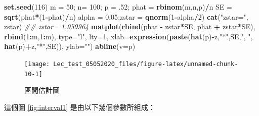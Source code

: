 \documentclass[hyperref,]{ctexart}
\newenvironment{Shaded}{\begin{snugshade}}{\end{snugshade}}
\newcommand{\CommentTok}[1]{\textcolor[rgb]{0.56,0.35,0.01}{\textit{#1}}}
\newcommand{\DataTypeTok}[1]{\textcolor[rgb]{0.13,0.29,0.53}{#1}}
\newcommand{\DecValTok}[1]{\textcolor[rgb]{0.00,0.00,0.81}{#1}}
\newcommand{\FloatTok}[1]{\textcolor[rgb]{0.00,0.00,0.81}{#1}}
\newcommand{\KeywordTok}[1]{\textcolor[rgb]{0.13,0.29,0.53}{\textbf{#1}}}
\newcommand{\NormalTok}[1]{#1}
\newcommand{\OperatorTok}[1]{\textcolor[rgb]{0.81,0.36,0.00}{\textbf{#1}}}
\newcommand{\StringTok}[1]{\textcolor[rgb]{0.31,0.60,0.02}{#1}}
\begin{document}
\begin{Shaded}
\begin{Highlighting}[]
\KeywordTok{set.seed}\NormalTok{(}\DecValTok{116}\NormalTok{)}
\NormalTok{m =}\StringTok{ }\DecValTok{50}\NormalTok{; n=}\StringTok{ }\DecValTok{100}\NormalTok{; p =}\StringTok{ }\FloatTok{.52}\NormalTok{;}
\NormalTok{phat =}\StringTok{ }\KeywordTok{rbinom}\NormalTok{(m,n,p)}\OperatorTok{/}\NormalTok{n}
\NormalTok{SE =}\StringTok{ }\KeywordTok{sqrt}\NormalTok{(phat}\OperatorTok{*}\NormalTok{(}\DecValTok{1}\OperatorTok{-}\NormalTok{phat)}\OperatorTok{/}\NormalTok{n)}
\NormalTok{alpha =}\StringTok{ }\FloatTok{0.05}\NormalTok{;zstar =}\StringTok{ }\KeywordTok{qnorm}\NormalTok{(}\DecValTok{1}\OperatorTok{-}\NormalTok{alpha}\OperatorTok{/}\DecValTok{2}\NormalTok{)}
\KeywordTok{cat}\NormalTok{(}\StringTok{"zstar="}\NormalTok{, zstar)}
\CommentTok{## zstar= 1.959964}
\KeywordTok{matplot}\NormalTok{(}\KeywordTok{rbind}\NormalTok{(phat }\OperatorTok{-}\StringTok{ }\NormalTok{zstar}\OperatorTok{*}\NormalTok{SE, phat }\OperatorTok{+}\StringTok{ }\NormalTok{zstar}\OperatorTok{*}\NormalTok{SE),}
  \KeywordTok{rbind}\NormalTok{(}\DecValTok{1}\OperatorTok{:}\NormalTok{m,}\DecValTok{1}\OperatorTok{:}\NormalTok{m), }\DataTypeTok{type=}\StringTok{"l"}\NormalTok{, }\DataTypeTok{lty=}\DecValTok{1}\NormalTok{,}
\DataTypeTok{xlab=}\KeywordTok{expression}\NormalTok{(}\KeywordTok{paste}\NormalTok{(}\KeywordTok{hat}\NormalTok{(p)}\OperatorTok{-}\NormalTok{z,}\StringTok{"*"}\NormalTok{,SE,}\StringTok{",  "}\NormalTok{, }\KeywordTok{hat}\NormalTok{(p)}\OperatorTok{+}\NormalTok{z,}\StringTok{"*"}\NormalTok{,SE)), }\DataTypeTok{ylab=}\StringTok{""}\NormalTok{)}
\KeywordTok{abline}\NormalTok{(}\DataTypeTok{v=}\NormalTok{p) }
\end{Highlighting}
\end{Shaded}

\begin{figure}

\texttt{[image: Lec\_test\_05052020\_files/figure-latex/unnamed-chunk-10-1]} \hfill{}

\caption{\label{fig:interval1}區間估計圖}\label{fig:unnamed-chunk-10}
\end{figure}

這個圖 \ref{fig:interval1} 是由以下幾個參數所組成：
\end{document}
